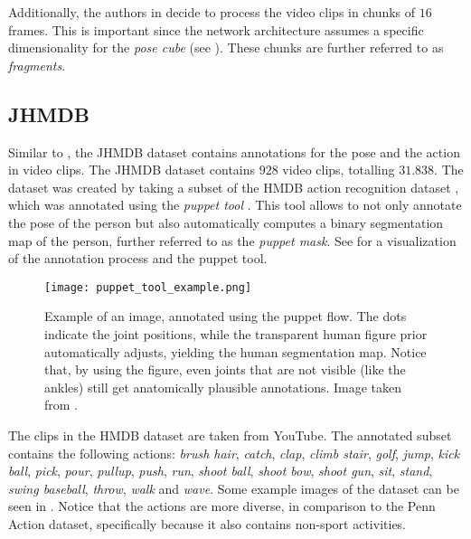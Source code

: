 Additionally, the authors in \cite{luvizon_2d/3d_2018} decide to process the video clips in chunks of $16$ frames.
This is important since the network architecture assumes a specific dimensionality for the \textit{pose cube} (see ).
These chunks are further referred to as \textit{fragments}.

\subsection{JHMDB}
\label{sec:exp-jhmdb}

Similar to \cite{zhang_actemes_2013} , the JHMDB dataset \cite{jhuang_towards_2013} contains annotations for the pose and the action in video clips.
The JHMDB dataset contains $928$ video clips, totalling $31.838$.
The dataset was created by taking a subset of the HMDB action recognition dataset \cite{kuehne_hmdb:_2011}, which was annotated using the \textit{puppet tool} \cite{zuffi_pictorial_2012}.
This tool allows to not only annotate the pose of the person but also automatically computes a binary segmentation map of the person, further referred to as the \textit{puppet mask}.
See  for a visualization of the annotation process and the puppet tool.

\begin{figure}[htb!]
    \centering
    \texttt{[image: puppet\_tool\_example.png]}
    \caption{Example of an image, annotated using the puppet flow. The dots indicate the joint positions, while the transparent human figure prior automatically adjusts, yielding the human segmentation map. Notice that, by using the figure, even joints that are not visible (like the ankles) still get anatomically plausible annotations. Image taken from \cite{max_planck_institute_for_intelligent_systems_jhmdb_nodate}.}
    \label{fig:puppet_tool_example}
\end{figure}

The clips in the HMDB dataset are taken from YouTube.
The annotated subset contains the following actions:
\textit{brush hair}, \textit{catch}, \textit{clap}, \textit{climb stair}, \textit{golf}, \textit{jump}, \textit{kick ball}, \textit{pick}, \textit{pour}, \textit{pullup}, \textit{push}, \textit{run}, \textit{shoot ball}, \textit{shoot bow}, \textit{shoot gun}, \textit{sit}, \textit{stand}, \textit{swing baseball}, \textit{throw}, \textit{walk} and \textit{wave}.
Some example images of the dataset can be seen in .
Notice that the actions are more diverse, in comparison to the Penn Action dataset, specifically because it also contains non-sport activities.


